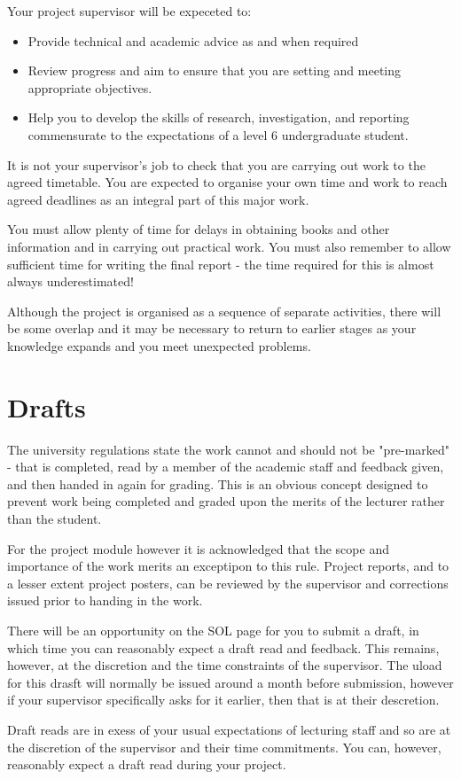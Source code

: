 Your project supervisor will be expeceted to: 

\begin{itemize}
    \item Provide technical and academic advice as and when required
    \item Review progress and aim to ensure that you are setting and meeting appropriate objectives.
    \item Help you to develop the skills of research, investigation, and reporting commensurate to the expectations of a level 6 undergraduate student. 
\end{itemize}

\begin{tcolorbox}
    It is not your supervisor’s job to check that you are carrying out work to the
    agreed timetable. You are expected to organise your own time and work to
    reach agreed deadlines as an integral part of this major work.
\end{tcolorbox}

You must allow plenty of time for delays in obtaining books and other information and in carrying out practical work. You must also remember to allow sufficient time for writing the final report - the time required for this is almost always underestimated!

Although the project is organised as a sequence of separate activities, there will be some overlap and it may be necessary to return to earlier stages as your knowledge expands and you meet unexpected problems.

\section{Drafts}

The university regulations state the work cannot and should not be "pre-marked" - that is completed, read by a member of the academic staff and feedback given, and then handed in again for grading. This is an obvious concept designed to prevent work being completed and graded upon the merits of the lecturer rather than the student. 

For the project module however it is acknowledged that the scope and importance of the work merits an exceptipon to this rule. Project reports, and to a lesser extent project posters, can be reviewed by the supervisor and corrections issued prior to handing in the work.

There will be an opportunity on the SOL page for you to submit a draft, in which time you can reasonably expect a draft read and feedback. This remains, however, at the discretion and the time constraints of the supervisor. The uload for this drasft will normally be issued around a month before submission, however if your supervisor specifically asks for it earlier, then that is at their descretion. 

\begin{tcolorbox}
    Draft reads are in exess of your usual expectations of lecturing staff and so are at the discretion of the supervisor and their time commitments. You can, however, reasonably expect a draft read during your project.
\end{tcolorbox}